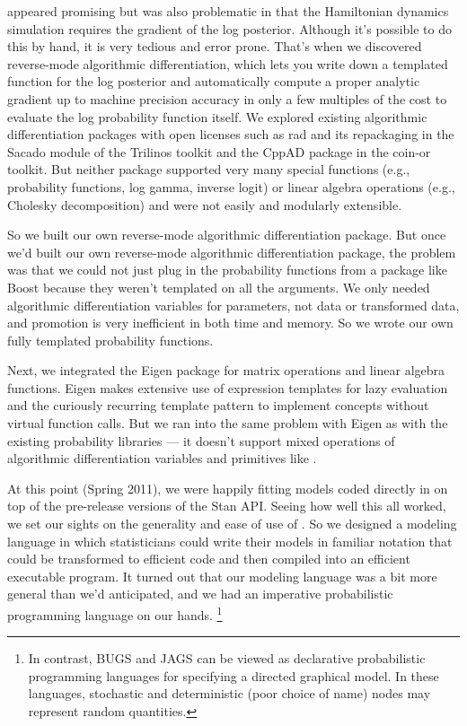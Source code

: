 \HMC appeared promising but was also problematic in that the
Hamiltonian dynamics simulation requires the gradient of the log
posterior.  Although it's possible to do this by hand, it is very
tedious and error prone.  That's when we discovered reverse-mode
algorithmic differentiation, which lets you write down a templated
\Cpp function for the log posterior and automatically compute a proper
analytic gradient up to machine precision accuracy in only a few
multiples of the cost to evaluate the log probability function itself.
We explored existing algorithmic differentiation packages with open
licenses such as {\sc rad} \citep{Gay:2005} and its repackaging in the
Sacado module of the Trilinos toolkit and the {\small CppAD} package in the
{\sc coin-or} toolkit.  But neither package supported very many
special functions (e.g., probability functions, log gamma, inverse logit) or
linear algebra operations (e.g., Cholesky decomposition) and were not
easily and modularly extensible.  

So we built our own reverse-mode algorithmic differentiation package.
But once we'd built our own reverse-mode algorithmic differentiation
package, the problem was that we could not just plug in the
probability functions from a package like Boost because they weren't
templated on all the arguments.  We only needed algorithmic
differentiation variables for parameters, not data or transformed
data, and promotion is very inefficient in both time and memory.  So
we wrote our own fully templated probability functions.  

Next, we integrated the Eigen \Cpp package for matrix operations and
linear algebra functions.  Eigen makes extensive use of expression
templates for lazy evaluation and the curiously recurring template
pattern to implement concepts without virtual function calls.  But we
ran into the same problem with Eigen as with the existing probability
libraries --- it doesn't support mixed operations of algorithmic
differentiation variables and primitives like .

At this point (Spring 2011), we were happily fitting models coded 
directly in \Cpp on top of the pre-release versions of the Stan API. 
Seeing how well this all worked, we set our sights on the generality 
and ease of use of \BUGS.  So we designed a modeling language in which 
statisticians could write their models in familiar notation that could 
be transformed to efficient \Cpp code and then compiled into an 
efficient executable program.  It turned out that our modeling
language was a bit more general than we'd anticipated, and we had an
imperative probabilistic programming language on our hands.%
%
\footnote{In contrast, BUGS and JAGS can be viewed as declarative
  probabilistic programming languages for specifying a directed
  graphical model.  In these languages, stochastic and deterministic
  (poor choice of name) nodes may represent random quantities.}
 
